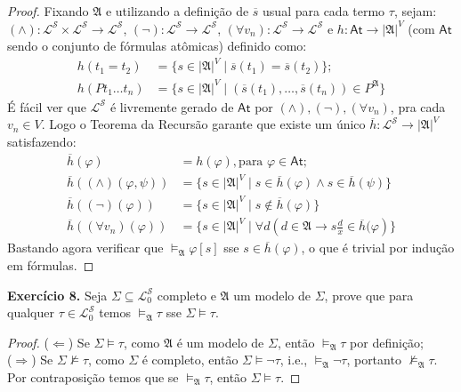 \documentclass[11pt]{article}
\newcommand{\mc}[1]{\mathcal{#1}}
\newcommand{\mf}[1]{\mathfrak{#1}}
\newcommand{\msf}[1]{\mathsf{#1}}
\begin{document}
\begin{proof}
    Fixando $\mf{A}$ e utilizando a definição de $\overline{s}$ usual para cada termo $\tau$, sejam:\\
    $(\wedge):\mc{L}^\mc{S}\times\mc{L}^\mc{S}\to\mc{L}^\mc{S}$, $(\neg):\mc{L}^\mc{S}\to\mc{L}^\mc{S}$, $(\forall v_n):\mc{L}^\mc{S}\to\mc{L}^\mc{S}$ e $h:\msf{At}\to|\mf{A}|^V$ (com $\msf{At}$ sendo o conjunto de fórmulas atômicas) definido como:
    \begin{align*}
        h(t_1=t_2) & =\{s\in|\mf{A}|^V\mid\overline{s}(t_1)=\overline{s}(t_2)\};\\
        h(Pt_1\dots t_n) & = \{s\in|\mf{A}|^V\mid(\overline{s}(t_1),\dots,\overline{s}(t_n))\in P^\mf{A}\}
    \end{align*}
    É fácil ver que $\mc{L}^\mc{S}$ é livremente gerado de $\msf{At}$ por $(\wedge),(\neg),(\forall v_n)$, pra cada $v_n\in V$. Logo o Teorema da Recursão garante que existe um único $\overline{h}:\mc{L}^\mc{S}\to|\mf{A}|^V$ satisfazendo:
    \begin{align*}
        \overline{h}(\varphi) & =h(\varphi), \text{para }\varphi\in\msf{At};\\
        \overline{h}((\wedge)(\varphi,\psi)) & = \{s\in|\mf{A}|^V\mid s\in\overline{h}(\varphi)\wedge s\in\overline{h}(\psi)\}\\
        \overline{h}((\neg)(\varphi)) & = \{s\in|\mf{A}|^V\mid s\notin\overline{h}(\varphi)\}\\
        \overline{h}((\forall v_n)(\varphi)) & = \bigl\{s\in|\mf{A}|^V\mid\forall d\left(d\in\mf{A}\to s\tfrac{d}{x}\in\overline{h}(\varphi\right)\bigr\}
    \end{align*}
    Bastando agora verificar que $\vDash_\mf{A}\varphi[s]$ sse $s\in\overline{h}(\varphi)$, o que é trivial por indução em fórmulas.
\end{proof}

\begin{shaded}
\textbf{Exercício 8.} Seja $\Sigma\subseteq\mc{L}_0^\mc{S}$ completo e $\mf{A}$ um modelo de $\Sigma$, prove que para qualquer $\tau\in\mc{L}_0^\mc{S}$ temos $\vDash_\mf{A}\tau$ sse $\Sigma\vDash\tau$.
\end{shaded}

\begin{proof}
    ($\Leftarrow$) Se $\Sigma\vDash\tau$, como $\mf{A}$ é um modelo de $\Sigma$, então $\vDash_\mf{A}\tau$ por definição;\\
    ($\Rightarrow$) Se $\Sigma\nvDash\tau$, como $\Sigma$ é completo, então $\Sigma\vDash\neg\tau$, i.e., $\vDash_\mf{A}\neg\tau$, portanto $\nvDash_\mf{A}\tau$. Por contraposição temos que se $\vDash_\mf{A}\tau$, então $\Sigma\vDash\tau$.
\end{proof}
\end{document}
